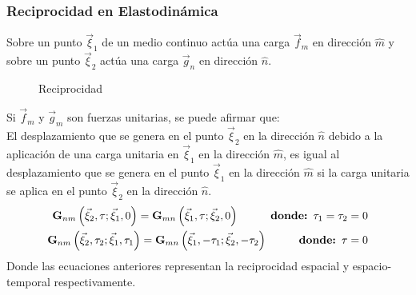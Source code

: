 \begin{frame}[allowframebreaks]
\frametitle{Reciprocidad en Elastodinámica}
%
\justifying
%
Sobre un punto $\vec{\xi}_1$ de un medio continuo actúa una carga $\vec{f}_m$ en dirección $\hat{m}$ y sobre un punto $\vec{\xi}_2$ actúa una carga $\vec{g}_n$ en dirección $\hat{n}$.
%
\begin{figure}[h]
\centering
%
	\caption{Reciprocidad}
	\vspace{-.5 cm}
%
\end{figure}
%
Si $\vec{f}_m$ y $\vec{g}_m$ son fuerzas unitarias, se puede afirmar que:\\
%
El desplazamiento que se genera en el punto $\vec{\xi}_2$ en la dirección $\hat{n}$ debido a la aplicación de una carga unitaria en $\vec{\xi}_1$ en la dirección $\hat{m}$, es igual al desplazamiento que se genera en el punto $\vec{\xi}_1$ en la dirección $\hat{m}$ si la carga unitaria se aplica en el punto $\vec{\xi}_2$ en la dirección $\hat{n}$.
%
\begin{align*}
	\mathbf{G}_{nm} \left( \vec{\xi}_2, \tau ; \vec{\xi}_1, 0 \right)  = \mathbf{G}_{mn} \left( \vec{\xi}_1, \tau ; \vec{\xi}_2, 0 \right) \hspace{1 cm} \textbf{donde: $\tau_1=\tau_2=0$}\\
	\mathbf{G}_{nm} \left( \vec{\xi}_2, \tau_2 ; \vec{\xi}_1, \tau_1 \right)  = \mathbf{G}_{mn} \left( \vec{\xi}_1, -\tau_1 ; \vec{\xi}_2, -\tau_2 \right) \hspace{1 cm} \textbf{donde: $\tau=0$}
\end{align*}
%
Donde las ecuaciones anteriores representan la reciprocidad espacial y espacio-temporal respectivamente.
%
%
\end{frame}
